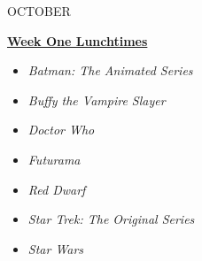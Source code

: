 \newenvironment{events-month}[2]{\ignorespaces
  \newcommand{\event}[4]{
    \begin{itemize}[leftmargin=4em]
    \item[\texttt{{##2} {##1}}] \ifthenelse{
      \isempty{##3}
    }{
      {##4}
    }{
      \textbf{##3}\newline
      \textit{##4}
    }
    \end{itemize}
  }
    ~
    \vspace{0.5em}
    \begin{center}
      \textbf{\large {#1}}
    \end{center}
    \vspace{1em} \hrule \vspace{0.5em}
{#2}
}{\ignorespacesafterend}
%
\begin{minipage}[t]{0.46\textwidth}
\begin{events-month}{OCTOBER}{
  }
\end{events-month}

\vspace{1.2em}
\begin{framed}
\vspace{-0.5em}
{\centering \underline{\textbf{Week One Lunchtimes}} \par}
\small
\begin{itemize}[leftmargin=2.5em,topsep=0pt,itemsep=-0.2em]
\newcommand{\lunchitem}[1]{\item[\textemdash{}] \textit{#1}}
\lunchitem{Batman: The Animated Series}
\lunchitem{Buffy the Vampire Slayer}
\lunchitem{Doctor Who}%
\lunchitem{Futurama}
\lunchitem{Red Dwarf}
\lunchitem{Star Trek: The Original Series}
\lunchitem{Star Wars}
\end{itemize}
\vspace{1em}
\end{framed}
\end{minipage}

